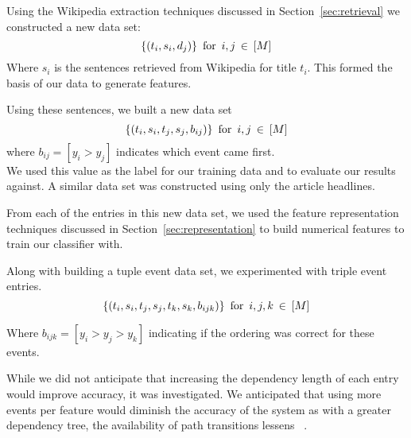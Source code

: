 \documentclass[bsc,frontabs,twoside,singlespacing,parskip,deptreport]{infthesis}     %
\begin{document}
    Using the Wikipedia extraction techniques discussed in Section~\ref{sec:retrieval} we constructed a new data set:
    \begin{equation}
      \{(t_{i},s_{i},d_{j})\} \hspace{0.5em} \text{for} \hspace{0.5em}i,j  \hspace{0.2em}\in \hspace{0.2em}[M]\nonumber
    \end{equation}
    Where $s_i$ is the sentences retrieved from Wikipedia for title $t_i$. 
    This formed the basis of our data to generate features.

    Using these sentences, we built a new data set
    \begin{equation}
      \{(t_{i},s_{i},t_{j},s_{j},b_{ij})\} \hspace{0.5em} \text{for} \hspace{0.5em} i,j \hspace{0.2em}\in \hspace{0.2em}[M]\nonumber
    \end{equation}
    where $b_{ij} = [y_{i} > y_{j}]$ indicates which event came first.\\
    We used this value as the label for our training data and to evaluate our results against.
    A similar data set was constructed using only the article headlines.
    
    From each of the entries in this new data set, we used the feature representation techniques discussed in Section~\ref{sec:representation} to build numerical
    features to train our classifier with.

Along with building a tuple event data set, we experimented with triple event entries.
\begin{equation}
      \{(t_{i},s_{i},t_{j},s_{j},t_{k},s_{k},b_{ijk})\} \hspace{0.5em} \text{for} \hspace{0.5em} i,j,k \hspace{0.2em}\in \hspace{0.2em}[M]\nonumber
\end{equation}

Where $b_{ijk} = [y_i > y_j > y_k]$ indicating if the ordering was correct for these events.

While we did not anticipate that increasing the dependency length of each entry would improve accuracy, it was investigated.
We anticipated that using more events per feature would diminish the accuracy of the system as
with a greater dependency tree, the availability of path transitions lessens~ \cite{gerdes2013computational}.
\end{document}
